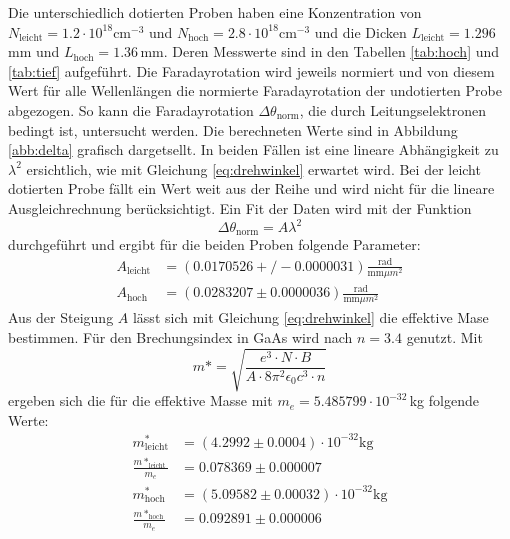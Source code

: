 Die unterschiedlich dotierten Proben haben eine Konzentration von $N_{\text{leicht}}=1.2\cdot10^{18}\text{cm}^{-3}$ und $N_{\text{hoch}}=2.8\cdot10^{18}\text{cm}^{-3}$ und die Dicken $L_{\text{leicht}}=1.296\,$mm und $L_{\text{hoch}}=1.36\,$mm.
Deren Messwerte sind in den Tabellen \ref{tab:hoch} und \ref{tab:tief} aufgeführt.
Die Faradayrotation wird jeweils normiert und von diesem Wert für alle Wellenlängen die normierte Faradayrotation der undotierten Probe abgezogen.
So kann die Faradayrotation $\Delta\theta_\text{norm}$, die durch Leitungselektronen bedingt ist, untersucht werden.
Die berechneten Werte sind in Abbildung \ref{abb:delta} grafisch dargetsellt.
In beiden Fällen ist eine lineare Abhängigkeit zu $\lambda^2$ ersichtlich, wie mit Gleichung \ref{eq:drehwinkel} erwartet wird.
Bei der leicht dotierten Probe fällt ein Wert weit aus der Reihe und wird nicht für die lineare Ausgleichrechnung berücksichtigt.
Ein Fit der Daten wird mit der Funktion
\begin{equation}
  \Delta\theta_{\text{norm}} = A\lambda^2
\end{equation}
durchgeführt und ergibt für die beiden Proben folgende Parameter:
\begin{align*}
  A_{\text{leicht}} &= (0.0170526 +/- 0.0000031) \frac{\text{rad}}{\text{mm}\mu m^2} \\
  A_{\text{hoch}} &= (0.0283207 \pm 0.0000036) \frac{\text{rad}}{\text{mm}\mu m^2}
\end{align*}
Aus der Steigung $A$ lässt sich mit Gleichung \ref{eq:drehwinkel} die effektive Mase bestimmen.
Für den Brechungsindex in GaAs wird nach \cite{nGaAs} $n=3.4$ genutzt.
Mit
\begin{equation}
  m*=\sqrt{\frac{e^3\cdot N \cdot B}{A\cdot 8\pi^2\epsilon_0 c^3 \cdot n }}
\end{equation}
ergeben sich die für die effektive Masse mit $m_e = 5.485799\cdot 10^{-32}\,$kg folgende Werte:
\begin{align*}
  m^*_{\text{leicht}} &= (4.2992 \pm 0.0004)\cdot 10^{-32}\text{kg} \\
  \frac{m*_{\text{leicht}}}{m_e} &= 0.078369\pm 0.000007 \\
  m^*_{\text{hoch}} &= (5.09582\pm 0.00032)\cdot 10^{-32}\text{kg} \\
  \frac{m*_{\text{hoch}}}{m_e} &= 0.092891\pm 0.000006\\
\end{align*}

